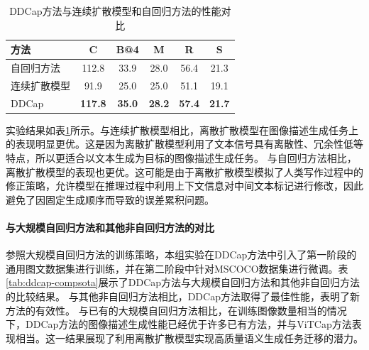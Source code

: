 \begin{table}
  \centering
  \caption{DDCap方法与连续扩散模型和自回归方法的性能对比}
  \begin{tabular}{lccccc}
    \toprule
    方法  & C & B@4 & M & R & S\\
    \midrule
    自回归方法 & 112.8  & 33.9 & 28.0 & 56.4 & 21.3\\
    连续扩散模型 & 91.9 & 25.0 &25.0&51.1& 19.1 \\
    DDCap  & \textbf{117.8} & \textbf{35.0}  & \textbf{28.2} & \textbf{57.4} & \textbf{21.7}\\
    \bottomrule
  \end{tabular}
  \label{tab:ddcap-framecom}
\end{table}
实验结果如表\ref{tab:ddcap-framecom}所示。与连续扩散模型相比，离散扩散模型在图像描述生成任务上的表现明显更优。这是因为离散扩散模型利用了文本信号具有离散性、冗余性低等特点，所以更适合以文本生成为目标的图像描述生成任务。
与自回归方法相比，离散扩散模型的表现也更优。这可能是由于离散扩散模型模拟了人类写作过程中的修正策略，允许模型在推理过程中利用上下文信息对中间文本标记进行修改，因此避免了因固定生成顺序而导致的误差累积问题。

\paragraph{与大规模自回归方法和其他非自回归方法的对比} 参照大规模自回归方法的训练策略，本组实验在DDCap方法中引入了第一阶段的通用图文数据集进行训练，并在第二阶段中针对MSCOCO数据集进行微调。表\ref{tab:ddcap-compsota}展示了DDCap方法与大规模自回归方法和其他非自回归方法的比较结果。
与其他非自回归方法相比，DDCap方法取得了最佳性能，表明了新方法的有效性。%
与已有的大规模自回归方法相比，在训练图像数量相当的情况下，DDCap方法的图像描述生成性能已经优于许多已有方法，并与ViTCap\cite{ViTCap}方法表现相当。这一结果展现了利用离散扩散模型实现高质量语义生成任务迁移的潜力。


